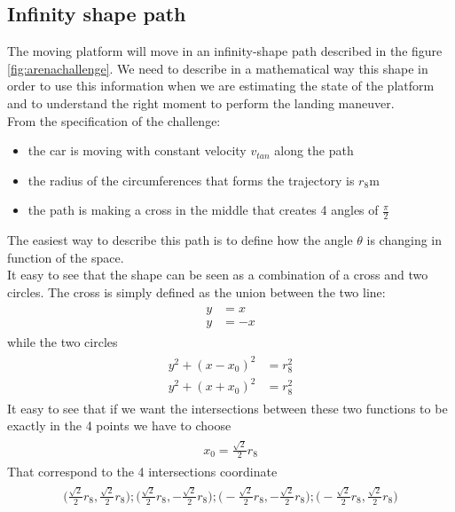 \subsection{Infinity shape path}
The moving platform will move in an infinity-shape path described in the figure \ref{fig:arenachallenge}. 
We need to describe in a mathematical way this shape in order to use this information when we are estimating the state of the platform and to understand the right moment to perform the landing maneuver.\\
From the specification of the challenge:
\begin{itemize}
\item the car is moving with constant velocity $v_{tan}$ along the path
\item the radius of the circumferences that forms the trajectory is $r_{8}$m
\item the path is making a cross in the middle that creates 4 angles of $\frac{\pi}{2}$ 
\end{itemize}
The easiest way to describe this path is to define how the angle $\theta$ is changing in function of the space. \\
It easy to see that the shape can be seen as a combination of a cross and two circles.
The cross is simply defined as the union between the two line:
\begin{align}
\begin{split}
y &= x \\
y &= -x
\end{split}
\end{align}
while the two circles 
\begin{align}
\begin{split}
y^2 + (x - x_0)^2 &= r_{8}^2 \\
y^2 + (x + x_0)^2 &= r_{8}^2 
\end{split}
\end{align}
It easy to see that if we want the intersections between these two functions to be exactly in the 4 points we have to choose 
\begin{align}
\begin{split}
x_0 = \frac{\sqrt{2}}{2}r_{8}
\end{split}
\end{align}
That correspond to the 4 intersections coordinate
\begin{align}
\begin{split}
\Big(\frac{\sqrt{2}}{2}r_{8},\frac{\sqrt{2}}{2}r_{8}\Big);
\Big(\frac{\sqrt{2}}{2}r_{8},-\frac{\sqrt{2}}{2}r_{8}\Big);
\Big(-\frac{\sqrt{2}}{2}r_{8},-\frac{\sqrt{2}}{2}r_{8}\Big);
\Big(-\frac{\sqrt{2}}{2}r_{8},\frac{\sqrt{2}}{2}r_{8}\Big)
\end{split}
\end{align}

